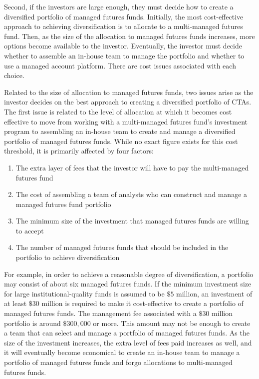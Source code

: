 \documentclass[11pt]{article}
\begin{document}
Second, if the investors are large enough, they must decide how to create a diversified portfolio of managed futures funds. Initially, the most cost-effective approach to achieving diversification is to allocate to a multi-managed futures fund. Then, as the size of the allocation to managed futures funds increases, more options become available to the investor. Eventually, the investor must decide whether to assemble an in-house team to manage the portfolio and whether to use a managed account platform. There are cost issues associated with each choice.

Related to the size of allocation to managed futures funds, two issues arise as the investor decides on the best approach to creating a diversified portfolio of CTAs. The first issue is related to the level of allocation at which it becomes cost effective to move from working with a multi-managed futures fund's investment program to assembling an in-house team to create and manage a diversified portfolio of managed futures funds. While no exact figure exists for this cost threshold, it is primarily affected by four factors:

\begin{enumerate}
  \item The extra layer of fees that the investor will have to pay the multi-managed futures fund

  \item The cost of assembling a team of analysts who can construct and manage a managed futures fund portfolio

  \item The minimum size of the investment that managed futures funds are willing to accept

  \item The number of managed futures funds that should be included in the portfolio to achieve diversification

\end{enumerate}

For example, in order to achieve a reasonable degree of diversification, a portfolio may consist of about six managed futures funds. If the minimum investment size for large institutional-quality funds is assumed to be $\$ 5$ million, an investment of at least $\$ 30$ million is required to make it cost-effective to create a portfolio of managed futures funds. The management fee associated with a $\$ 30$ million portfolio is around $\$ 300,000$ or more. This amount may not be enough to create a team that can select and manage a portfolio of managed futures funds. As the size of the investment increases, the extra level of fees paid increases as well, and it will eventually become economical to create an in-house team to manage a portfolio of managed futures funds and forgo allocations to multi-managed futures funds.
\end{document}
